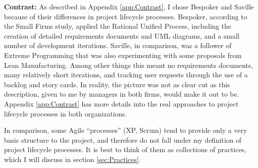 {\par \textbf{Contrast:} As described in Appendix \ref{app:Contrast}, I chose Bespoker and Saville because of their differences in project lifecycle processes. Bespoker, according to the Small Firms study, applied the Rational Unified Process, including the creation of detailed requirements documents and UML diagrams, and a small number of development iterations. Saville, in comparison, was a follower of Extreme Programming that was also experimenting with some proposals from Lean Manufacturing. Among other things this meant no requirements documents, many relatively short iterations, and tracking user requests through the use of a backlog and story cards. In reality, the picture was not as clear cut as this description, given to me by managers in both firms, would make it out to be. Appendix \ref{app:Contrast} has more details into the real approaches to project lifecycle processes in both organizations.} In comparison, some Agile ``processes'' (XP, Scrum) tend to provide only a very basic structure to the project, and therefore do not fall under my definition of project lifecycle processes. It is best to think of them as collections of practices, which I will discuss in section \ref{sec:Practices}.

